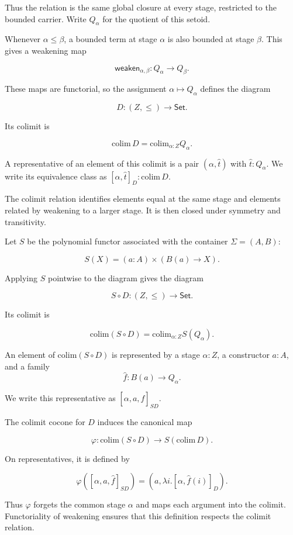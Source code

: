 \documentclass[runningheads]{llncs}
\begin{document}
Thus the relation is the same global closure at every stage, restricted
to the bounded carrier. Write \(Q_\alpha\) for the quotient of this
setoid.

Whenever \(\alpha\leq\beta\), a bounded term at stage \(\alpha\) is also
bounded at stage \(\beta\). This gives a weakening map

\[
\mathsf{weaken}_{\alpha,\beta}:
Q_\alpha
\to
Q_\beta.
\]

These maps are functorial, so the assignment
\(\alpha\longmapsto Q_\alpha\) defines the diagram

\[
D:(Z,\leq)\to\mathsf{Set}.
\]

Its colimit is

\[
\mathrm{colim}\,D = \mathrm{colim}_{\alpha:Z} Q_\alpha.
\]

A representative of an element of this colimit is a pair
\((\alpha,\widehat{t})\) with \(\widehat{t}:Q_\alpha\).
We write its equivalence class as \([\alpha,\widehat{t}]_D:\mathrm{colim}\,D.\)

The colimit relation identifies elements equal at the same stage and
elements related by weakening to a larger stage. It is then closed under
symmetry and transitivity.

Let \(S\) be the polynomial functor associated with the container
\(\Sigma=(A,B)\):

\[
S (X) = (a:A)\times (B (a)\to X).
\]

Applying \(S\) pointwise to the diagram gives the diagram

\[
S\circ D:(Z,\leq)\to\mathsf{Set}.
\]

Its colimit is

\[
\mathrm{colim}(S\circ D) = \mathrm{colim}_{\alpha:Z} S (Q_\alpha).
\]

An element of \(\mathrm{colim}(S\circ D)\) is represented by a stage
\(\alpha:Z\), a constructor \(a:A\), and a family
\[
\widehat{f}:B (a)\to Q_\alpha.
\]

We write this representative as \([\alpha,a,\widehat{f}]_{SD}.\)

The colimit cocone for \(D\) induces the canonical map

\[
\varphi: \mathrm{colim}(S\circ D) \longrightarrow S (\mathrm{colim}\,D).
\]

On representatives, it is defined by

\[
\varphi ([\alpha,a,\widehat{f}]_{SD})
=
\left(
a,\lambda i.[\alpha,\widehat{f} (i)]_D
\right).
\]

Thus \(\varphi\) forgets the common stage \(\alpha\) and maps each
argument into the colimit. Functoriality of weakening ensures that this
definition respects the colimit relation.
\end{document}
